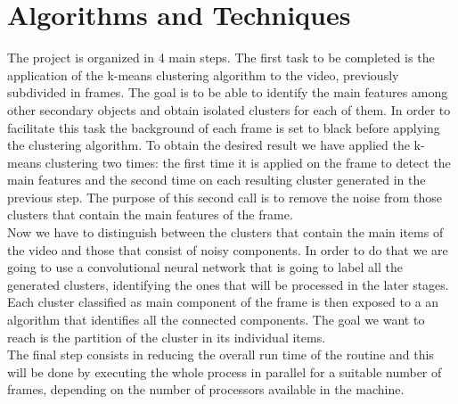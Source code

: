 \documentclass{article}
\begin{document}
{\section{Algorithms and Techniques}
The project is organized in 4 main steps. The first task to be completed is the application of the k-means clustering algorithm to the video, previously subdivided in frames. The goal is to be able to identify the main features among other secondary objects and obtain isolated clusters for each of them. In order to facilitate this task the background of each frame is set to black before applying the clustering algorithm. To obtain the desired result we have applied the k-means clustering two times: the first time it is applied on the frame to detect the main features and the second time on each resulting cluster generated in the previous step. The purpose of this second call is to remove the noise from those clusters that contain the main features of the frame. \\
Now we have to distinguish between the clusters that contain the main items of the video and those that consist of noisy components. In order to do that we are going to use a convolutional neural network that is going to label all the generated clusters, identifying the ones that will be processed in the later stages. \\
Each cluster classified as main component of the frame is then exposed to a an algorithm that identifies all the connected components. The goal we want to reach is the partition of the cluster in its individual items.  \\
The final step consists in reducing the overall run time of the routine and this will be done by executing the whole process in parallel for a suitable number of frames, depending on the number of processors available in the machine.
}
\end{document}
